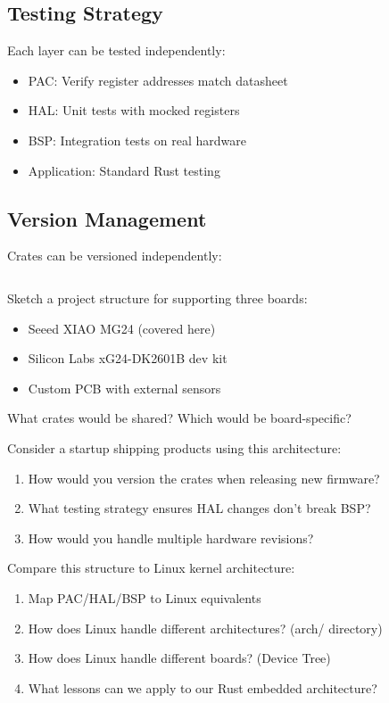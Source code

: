 \subsection{Testing Strategy}
Each layer can be tested independently:
\begin{itemize}
    \item PAC: Verify register addresses match datasheet
    \item HAL: Unit tests with mocked registers
    \item BSP: Integration tests on real hardware
    \item Application: Standard Rust testing
\end{itemize}

\subsection{Version Management}
Crates can be versioned independently:
\begin{verbatim}\end{verbatim}

\begin{exercise}[Easy]
    Sketch a project structure for supporting three boards:
    \begin{itemize}
        \item Seeed XIAO MG24 (covered here)
        \item Silicon Labs xG24-DK2601B dev kit
        \item Custom PCB with external sensors
    \end{itemize}
    What crates would be shared? Which would be board-specific?
\end{exercise}

\begin{exercise}[Medium]
    Consider a startup shipping products using this architecture:
    \begin{enumerate}
        \item How would you version the crates when releasing new firmware?
        \item What testing strategy ensures HAL changes don't break BSP?
        \item How would you handle multiple hardware revisions?
    \end{enumerate}
\end{exercise}

\begin{exercise}[Hard]
    Compare this structure to Linux kernel architecture:
    \begin{enumerate}
        \item Map PAC/HAL/BSP to Linux equivalents
        \item How does Linux handle different architectures? (arch/ directory)
        \item How does Linux handle different boards? (Device Tree)
        \item What lessons can we apply to our Rust embedded architecture?
    \end{enumerate}
\end{exercise}
\clearpage

